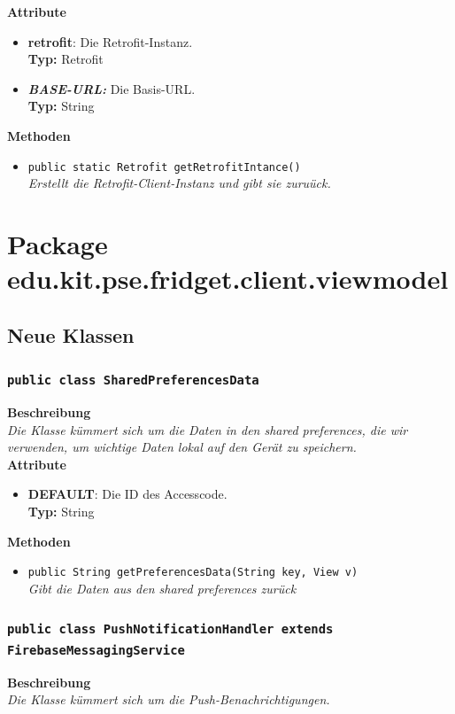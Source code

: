 \documentclass[a4paper]{scrreprt}
\begin{document}
	\textbf{Attribute}
	\begin{itemize}
		\item \textbf{retrofit}: Die Retrofit-Instanz. \\
		\textbf{Typ:} Retrofit
		
		\item \textbf\textit{{BASE-URL:}} Die Basis-URL. \\
		\textbf{Typ:} String
	\end{itemize}
	\textbf{Methoden}
	\begin{itemize}
		\item{\texttt{public static Retrofit getRetrofitIntance()}}\\
		\textit{Erstellt die Retrofit-Client-Instanz und gibt sie zuruück.}\\
	\end{itemize}
	
	\section{Package edu.kit.pse.fridget.client.viewmodel}
	\subsection{Neue Klassen}
	\subsubsection{\texttt{public class SharedPreferencesData}}
	\textbf{Beschreibung} \\
	\textit{Die Klasse kümmert sich um die Daten in den shared preferences, die wir verwenden, um wichtige Daten lokal auf den Gerät zu speichern.} \\
	
	\textbf{Attribute}
	\begin{itemize}
		\item \textbf{DEFAULT}: Die ID des Accesscode. \\
		\textbf{Typ:} String
	\end{itemize}
	
	\textbf{Methoden}
	\begin{itemize}
		\item{\texttt{public String getPreferencesData(String key, View v)}}\\
		\textit{Gibt die Daten aus den shared preferences zurück}\\
	\end{itemize}


\subsubsection{\texttt{public class PushNotificationHandler extends FirebaseMessagingService}}
\textbf{Beschreibung} \\
\textit{Die Klasse kümmert sich um die Push-Benachrichtigungen.} \\
\end{document}
